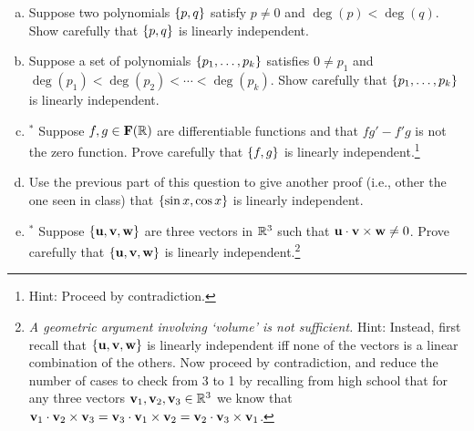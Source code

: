 \begin{prob}
\begin{enumerate}[a)]
\item\sov Suppose two  polynomials $\{p, q \}$ satisfy $p\not=0$ and $\deg(p) <\deg(q)$. Show carefully that $\{p,q \}$  is linearly independent. \medskip
%



\item Suppose a set of   polynomials $\{p_1, \dots, p_k \}$ satisfies $0\not=p_1$ and $\deg(p_1) <\deg(p_2)< \cdots < \deg (p_k)$. Show carefully that $\{p_1, \dots, p_k \}$  is linearly independent. \medskip
%
\item$^\ast$ Suppose $f,g \in \mathbf{F}(\mathbb{R})$ are differentiable functions and that  $fg'-f'g $ is not the zero function. Prove carefully that $\{f,g \}$ is linearly independent.\footnote{ Hint: Proceed by contradiction.}\medskip     
%
\item Use the previous part of this question to give another proof (i.e., other the one seen in class) that $\{\sin x, \cos x \}$ is linearly independent.\medskip
%
\item\sov$^\ast$   Suppose $\{\mathbf{u},\mathbf{v},\mathbf{w} \}$ are three vectors in $\mathbb{R}^3$ such that $\mathbf{u}\cdot \mathbf{v}\times \mathbf{w} \neq 0$. Prove carefully that $\{\mathbf{u},\mathbf{v},\mathbf{w} \}$ is linearly independent.\footnote{  {\it A geometric argument involving `volume' is not sufficient.} Hint: Instead, first recall that  $\{\mathbf{u},\mathbf{v},\mathbf{w} \}$ is linearly independent iff none of the vectors is a linear combination of the others. Now proceed by contradiction, and reduce the number of cases to check from 3 to 1 by recalling  from high school that for any three vectors $\mathbf{v}_1, \mathbf{v}_2, \mathbf{v}_3 \in \mathbb{R}^3$ we know that  $\mathbf{v}_1\cdot \mathbf{v}_2\times \mathbf{v}_3=\mathbf{v}_3\cdot \mathbf{v}_1\times \mathbf{v}_2=\mathbf{v}_2\cdot \mathbf{v}_3\times \mathbf{v}_1$.} 
\end{enumerate}
 \end{prob} 
